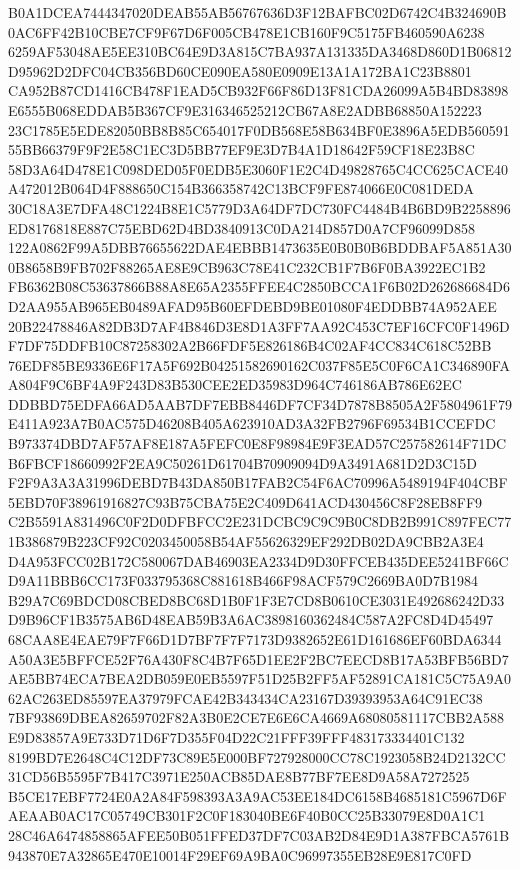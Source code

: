 \documentclass[UTF8,fontset=fandol,zihao=-4,a4paper]{ctexart}
\begin{document}
{{B0A1DCEA7444347020DEAB55AB56767636D3F12BAFBC02D6742C4B324690B0AC6FF42B10CBE7CF9F67D6F005CB478E1CB160F9C5175FB460590A6238
6259AF53048AE5EE310BC64E9D3A815C7BA937A131335DA3468D860D1B06812D95962D2DFC04CB356BD60CE090EA580E0909E13A1A172BA1C23B8801
CA952B87CD1416CB478F1EAD5CB932F66F86D13F81CDA26099A5B4BD83898E6555B068EDDAB5B367CF9E316346525212CB67A8E2ADBB68850A152223
23C1785E5EDE82050BB8B85C654017F0DB568E58B634BF0E3896A5EDB56059155BB66379F9F2E58C1EC3D5BB77EF9E3D7B4A1D18642F59CF18E23B8C
58D3A64D478E1C098DED05F0EDB5E3060F1E2C4D49828765C4CC625CACE40A472012B064D4F888650C154B366358742C13BCF9FE874066E0C081DEDA
30C18A3E7DFA48C1224B8E1C5779D3A64DF7DC730FC4484B4B6BD9B2258896ED8176818E887C75EBD62D4BD3840913C0DA214D857D0A7CF96099D858
122A0862F99A5DBB76655622DAE4EBBB1473635E0B0B0B6BDDBAF5A851A300B8658B9FB702F88265AE8E9CB963C78E41C232CB1F7B6F0BA3922EC1B2
FB6362B08C53637866B88A8E65A2355FFEE4C2850BCCA1F6B02D262686684D6D2AA955AB965EB0489AFAD95B60EFDEBD9BE01080F4EDDBB74A952AEE
20B22478846A82DB3D7AF4B846D3E8D1A3FF7AA92C453C7EF16CFC0F1496DF7DF75DDFB10C87258302A2B66FDF5E826186B4C02AF4CC834C618C52BB
76EDF85BE9336E6F17A5F692B04251582690162C037F85E5C0F6CA1C346890FAA804F9C6BF4A9F243D83B530CEE2ED35983D964C746186AB786E62EC
DDBBD75EDFA66AD5AAB7DF7EBB8446DF7CF34D7878B8505A2F5804961F79E411A923A7B0AC575D46208B405A623910AD3A32FB2796F69534B1CCEFDC
B973374DBD7AF57AF8E187A5FEFC0E8F98984E9F3EAD57C257582614F71DCB6FBCF18660992F2EA9C50261D61704B70909094D9A3491A681D2D3C15D
F2F9A3A3A31996DEBD7B43DA850B17FAB2C54F6AC70996A5489194F404CBF5EBD70F38961916827C93B75CBA75E2C409D641ACD430456C8F28EB8FF9
C2B5591A831496C0F2D0DFBFCC2E231DCBC9C9C9B0C8DB2B991C897FEC771B386879B223CF92C0203450058B54AF55626329EF292DB02DA9CBB2A3E4
D4A953FCC02B172C580067DAB46903EA2334D9D30FFCEB435DEE5241BF66CD9A11BBB6CC173F033795368C881618B466F98ACF579C2669BA0D7B1984
B29A7C69BDCD08CBED8BC68D1B0F1F3E7CD8B0610CE3031E492686242D33D9B96CF1B3575AB6D48EAB59B3A6AC3898160362484C587A2FC8D4D45497
68CAA8E4EAE79F7F66D1D7BF7F7F7173D9382652E61D161686EF60BDA6344A50A3E5BFFCE52F76A430F8C4B7F65D1EE2F2BC7EECD8B17A53BFB56BD7
AE5BB74ECA7BEA2DB059E0EB5597F51D25B2FF5AF52891CA181C5C75A9A062AC263ED85597EA37979FCAE42B343434CA23167D39393953A64C91EC38
7BF93869DBEA82659702F82A3B0E2CE7E6E6CA4669A68080581117CBB2A588E9D83857A9E733D71D6F7D355F04D22C21FFF39FFF483173334401C132
8199BD7E2648C4C12DF73C89E5E000BF727928000CC78C1923058B24D2132CC31CD56B5595F7B417C3971E250ACB85DAE8B77BF7EE8D9A58A7272525
B5CE17EBF7724E0A2A84F598393A3A9AC53EE184DC6158B4685181C5967D6FAEAAB0AC17C05749CB301F2C0F183040BE6F40B0CC25B33079E8D0A1C1
28C46A6474858865AFEE50B051FFED37DF7C03AB2D84E9D1A387FBCA5761B943870E7A32865E470E10014F29EF69A9BA0C96997355EB28E9E817C0FD
}}
\end{document}
